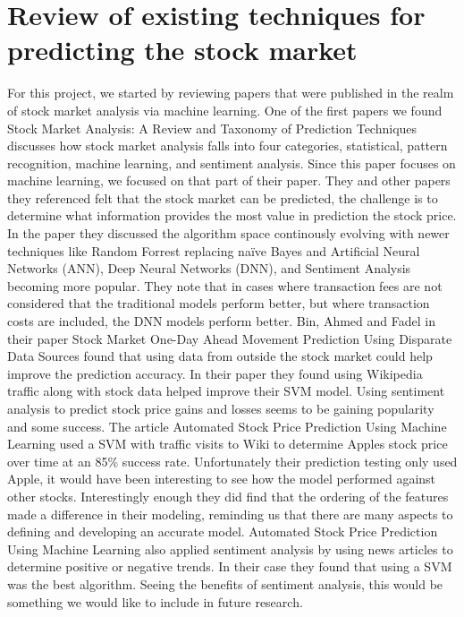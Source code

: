 \documentclass[conference]{IEEEtran}
\begin{document}
\section{Review of existing techniques for predicting the stock market}
For this project, we started by reviewing papers that were published in the realm of stock market analysis via machine learning.  One of the first papers we found Stock Market Analysis: A Review and Taxonomy of Prediction Techniques \cite{TaxonomyofPrediction} discusses how stock market analysis falls into four categories, statistical, pattern recognition, machine learning, and sentiment analysis.  Since this paper focuses on machine learning, we focused on that part of their paper.  They and other papers they referenced felt that the stock market can be predicted, the challenge is to determine what information provides the most value in prediction the stock price.  In the paper they discussed the algorithm space continously evolving with newer techniques like Random Forrest replacing naïve Bayes and  Artificial Neural Networks (ANN), Deep Neural Networks (DNN), and Sentiment Analysis becoming more popular.  They note that in cases where transaction fees are not considered that the traditional models perform better, but where transaction costs are included, the DNN models perform better. Bin, Ahmed and Fadel in their paper Stock Market One-Day Ahead Movement Prediction Using Disparate Data Sources\cite {Onedayahead} found that using data from outside the stock market could help improve the prediction accuracy.  In their paper they found using Wikipedia traffic along with stock data helped improve their SVM model.  Using sentiment analysis to predict stock price gains and losses seems to be gaining popularity and some success.  The article Automated Stock Price Prediction Using Machine Learning \cite{AutomatedPrediction} used a SVM with traffic visits to Wiki to determine Apples stock price over time at an 85\% success rate. Unfortunately their prediction testing only used Apple, it would have been interesting to see how the model performed against other stocks.  Interestingly enough they did find that the ordering of the features made a difference in their modeling, reminding us that there are many aspects to defining and developing an accurate model.  Automated Stock Price Prediction Using Machine Learning \cite{AutomatedPrediction} also applied sentiment analysis by using news articles to determine positive or negative trends. In their case they found that using a SVM was the best algorithm.  Seeing the benefits of sentiment analysis, this would be something we would like to include in future research. 
\end{document}
